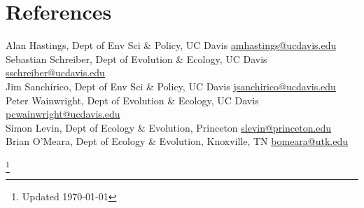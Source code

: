 \documentclass[margin]{res}
\begin{document}
\begin{resume}
\begin{position}
\end{position}

\begin{position}
\end{position}





\section{References}

Alan Hastings, Dept of Env Sci \& Policy, UC Davis \href{mailto:amhastings@ucdavis.edu}{amhastings@ucdavis.edu} \\ 
Sebastian Schreiber, Dept of Evolution \& Ecology, UC Davis \href{mailto:sschreiber@ucdavis.edu}{sschreiber@ucdavis.edu} \\
Jim Sanchirico, Dept of Env Sci \& Policy, UC Davis \href{mailto:jsanchirico@ucdavis.edu}{jsanchirico@ucdavis.edu} \\
Peter Wainwright, Dept of Evolution \& Ecology, UC Davis \href{mailto:pcwainwright@ucdavis.edu}{pcwainwright@ucdavis.edu} \\
Simon Levin, Dept of Ecology \& Evolution, Princeton \href{mailto:slevin@princeton.edu}{slevin@princeton.edu} \\
Brian O'Meara, Dept of Ecology \& Evolution, Knoxville, TN \href{mailto:bomeara@utk.edu}{bomeara@utk.edu}

\end{resume}
\let\thefootnote\relax\footnote{Updated \today}
\end{document}
